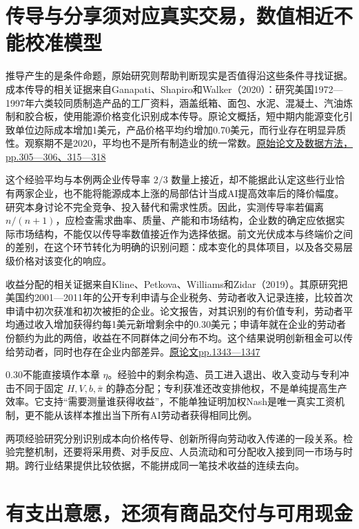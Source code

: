 \documentclass[UTF8,fontset=windows,12pt,a4paper,oneside,openany]{ctexbook}
\begin{document}
\section{传导与分享须对应真实交易，数值相近不能校准模型}

推导产生的是条件命题，原始研究则帮助判断现实是否值得沿这些条件寻找证据。成本传导的相关证据来自Ganapati、Shapiro和Walker（2020）：研究美国1972—1997年六类较同质制造产品的工厂资料，涵盖纸箱、面包、水泥、混凝土、汽油炼制和胶合板，使用能源价格变化识别成本传导。原论文概括，短中期内能源变化引致单位边际成本增加1美元，产品价格平均约增加0.70美元，而行业存在明显异质性。观察期不是2020，平均也不是所有制造业的统一常数。\href{https://www.sganapati.com/files/Ganapati_Shapiro_Walker_Energy_Cost_Pass-Through_AEJ_AE_2020.pdf}{原始论文及数据方法，pp.305—306、315—318}

这个经验平均与本例两企业传导率 \(2/3\) 数量上接近，却不能据此认定这些行业恰有两家企业，也不能将能源成本上涨的局部估计当成AI提高效率后的降价幅度。研究本身讨论不完全竞争、投入替代和需求性质。因此，实测传导率若偏离 \(n/(n+1)\)，应检查需求曲率、质量、产能和市场结构，企业数的确定应依据实际市场结构，不能仅以传导率数值接近作为选择依据。前文光伏成本与终端价之间的差别，在这个环节转化为明确的识别问题：成本变化的具体项目，以及各交易层级价格对该变化的响应。

收益分配的相关证据来自Kline、Petkova、Williams和Zidar（2019）。其原研究把美国约2001—2011年的公开专利申请与企业税务、劳动者收入记录连接，比较首次申请中初次获准和初次被拒的企业。论文报告，对其识别的有价值专利，劳动者平均通过收入增加获得约每1美元新增剩余中的0.30美元；申请年就在企业的劳动者份额约为此的两倍，收益在不同群体之间分布不均。这个结果说明创新租金可以传给劳动者，同时也存在企业内部差异。\href{https://zidar.princeton.edu/sites/g/files/toruqf3371/files/zidar/files/kpwz.pdf}{原论文pp.1343—1347}

0.30不能直接填作本章 \(\eta\)。经验中的剩余构造、员工进入退出、收入变动与专利冲击不同于固定 \(H,V,b,\bar\pi\) 的静态分配；专利获准还改变排他权，不是单纯提高生产效率。它支持“需要测量谁获得收益”，不能单独证明加权Nash是唯一真实工资机制，更不能从该样本推出当下所有AI劳动者获得相同比例。

两项经验研究分别识别成本向价格传导、创新所得向劳动收入传递的一段关系。检验完整机制，还要将采用费、对手反应、人员流动和可分配收入接到同一市场与时期。跨行业结果提供比较依据，不能拼成同一笔技术收益的连续去向。

\section{有支出意愿，还须有商品交付与可用现金}
\end{document}
